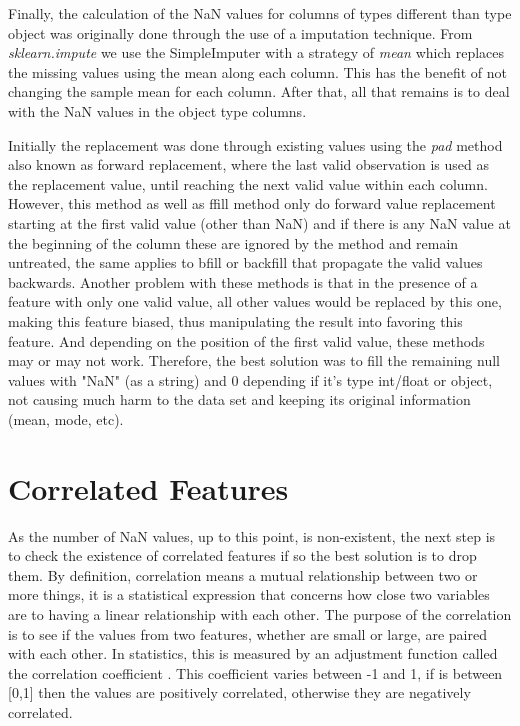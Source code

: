 Finally, the calculation of the NaN values for columns of types different than type object was originally done through the use of a imputation technique. From \textit{sklearn.impute} we use the SimpleImputer with a strategy of \textit{mean} which replaces the missing values using the mean along each column. This has the benefit of not changing the sample mean for each column. After that, all that remains is to deal with the NaN values in the object type columns.

Initially the replacement was done through existing values using the \textit{pad} method also known as forward replacement, where the last valid observation is used as the replacement value, until reaching the next valid value within each column. However, this method as well as ffill method only do forward value replacement starting at the first valid value (other than NaN) and if there is any NaN value at the beginning of the column these are ignored by the method and remain untreated, the same applies to bfill or backfill that propagate the valid values backwards. Another problem with these methods is that in the presence of a feature with only one valid value, all other values would be replaced by this one, making this feature biased, thus manipulating the result into favoring this feature. And depending on the position of the first valid value, these methods may or may not work. Therefore, the best solution was to fill the remaining null values with "NaN" (as a string) and 0 depending if it's type int/float or object, not causing much harm to the data set and keeping its original information (mean, mode, etc). 




\section{Correlated Features}
\label{sec:correlated_features}
\hspace{10px}As the number of NaN values, up to this point, is non-existent, the next step is to check the existence of correlated features if so the best solution is to drop them. By definition, correlation means a mutual relationship between two or more things, it is a statistical expression that concerns how close two variables are to having a linear relationship with each other\cite{Vishal}. The purpose of the correlation is to see if the values from two features, whether are small or large, are paired with each other. In statistics, this is measured by an adjustment function called the correlation coefficient \cite{corrwebsite}. This coefficient varies between -1 and 1, if is between [0,1] then the values are positively correlated, otherwise they are negatively correlated.

